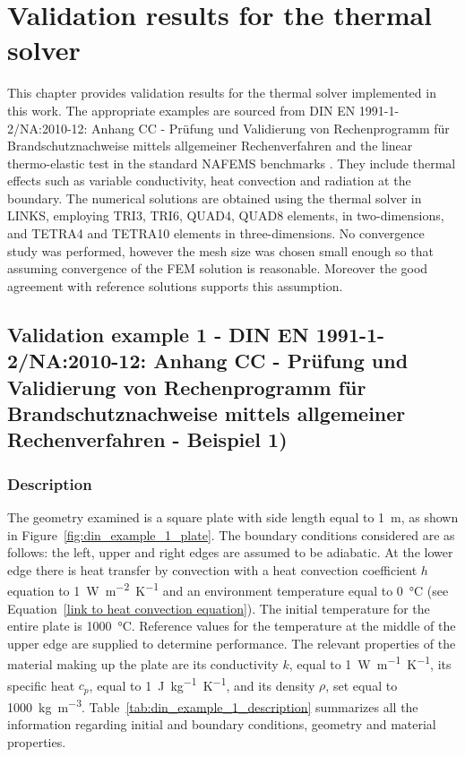\chapter{Validation results for the thermal solver}

This chapter provides validation results for the thermal solver implemented in this work.
The appropriate examples are sourced from DIN EN 1991-1-2/NA:2010-12: Anhang CC - Prüfung und  Validierung von Rechenprogramm für Brand\-schutz\-nach\-weise mittels allgemeiner Rechenverfahren \cite{} and the linear thermo-elastic test in the standard NAFEMS benchmarks \cite{}.
They include thermal effects such as variable conductivity, heat convection and radiation at the boundary.
The numerical solutions are obtained using the thermal solver in LINKS, employing TRI3, TRI6, QUAD4, QUAD8 elements, in two-dimensions, and TETRA4 and TETRA10 elements in three-dimensions.
No convergence study was performed, however the mesh size was chosen small enough so that assuming convergence of the FEM solution is reasonable.
Moreover the good agreement with reference solutions supports this assumption.

\section{Validation example 1 - DIN EN 1991-1-2/NA:2010-12: Anhang CC - Prüfung und Validierung von Rechenprogramm für Brandschutznachweise mittels allgemeiner Rechenverfahren - Beispiel 1)}

\subsection{Description}

The geometry examined is a square plate with side length equal to \SI{1}{\meter}, as shown in Figure~\ref{fig:din_example_1_plate}.
The boundary conditions considered are as follows: the left, upper and right edges are assumed to be adiabatic.
At the lower edge there is heat transfer by convection with a heat convection coefficient \(h\) equation to \SI{1}{\watt\meter^{-2}\kelvin^{-1}} and an environment temperature equal to \SI{0}{\celsius} (see Equation~\ref{link to heat convection equation}).
The initial temperature for the entire plate is \SI{1000}{\celsius}.
Reference values for the temperature at the middle of the upper edge are supplied to determine performance.
The relevant properties of the material making up the plate are its conductivity \(k\), equal to \SI{1}{\watt\meter^{-1}\kelvin^{-1}}, its specific heat \(c_p\), equal to \SI{1}{\joule\kilo\gram^{-1}\kelvin^{-1}}, and its density \(\rho\), set equal to \SI{1000}{\kilo\gram\meter^{-3}}.
Table~\ref{tab:din_example_1_description} summarizes all the information regarding initial and boundary conditions, geometry and material properties.

